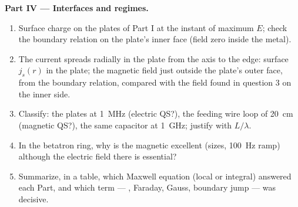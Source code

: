 \begin{problem}
\medskip
\noindent\textbf{Part IV --- Interfaces and regimes.}
\begin{enumerate}[resume]
  \item Surface charge on the plates of Part I at the instant of
        maximum $E$; check the boundary relation on the plate's inner
        face (field zero inside the metal).
  \item The current spreads radially in the plate from the axis to
        the edge: surface  $j_s(r)$ in the plate; the
        magnetic field just outside the plate's outer face, from the
        boundary relation, compared with the field found in question 3
        on the inner side.
  \item Classify: the plates at \qty{1}{MHz} (electric QS?), the feeding
        wire loop of \qty{20}{cm} (magnetic QS?), the same capacitor at
        \qty{1}{GHz}; justify with $L/\lambda$.
  \item In the betatron ring, why is the magnetic  excellent (sizes, \qty{100}{Hz} ramp) although the
        electric field there is essential?
  \item Summarize, in a table, which Maxwell equation (local or
        integral) answered each Part, and which term --- , Faraday, Gauss, boundary jump --- was decisive.
\end{enumerate}
\end{problem}

